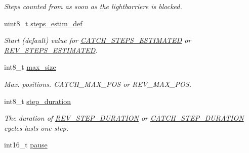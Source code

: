 \begin{CompactItemize}
\begin{CompactList}\small\item\em Steps counted from as soon as the lightbarriere is blocked. \item\end{CompactList}\item 
\hypertarget{structstepper__motor__t_3351f7a8001ddf9e7107778f92118717}{
uint8\_\-t \hyperlink{structstepper__motor__t_3351f7a8001ddf9e7107778f92118717}{steps\_\-estim\_\-def}}
\label{structstepper__motor__t_3351f7a8001ddf9e7107778f92118717}

\begin{CompactList}\small\item\em Start (default) value for \hyperlink{system_8h_ba0891209663ce63a925b18b553212c0}{CATCH\_\-STEPS\_\-ESTIMATED} or \hyperlink{system_8h_f0bdf5d3d7484b99405ef9f1373d8786}{REV\_\-STEPS\_\-ESTIMATED}. \item\end{CompactList}\item 
\hypertarget{structstepper__motor__t_9321372de70c6e871bcb0a9e14b28c87}{
int8\_\-t \hyperlink{structstepper__motor__t_9321372de70c6e871bcb0a9e14b28c87}{max\_\-size}}
\label{structstepper__motor__t_9321372de70c6e871bcb0a9e14b28c87}

\begin{CompactList}\small\item\em Max. positions. CATCH\_\-MAX\_\-POS or REV\_\-MAX\_\-POS. \item\end{CompactList}\item 
\hypertarget{structstepper__motor__t_c167ddba27c9544bb898f03c9b129ab9}{
int8\_\-t \hyperlink{structstepper__motor__t_c167ddba27c9544bb898f03c9b129ab9}{step\_\-duration}}
\label{structstepper__motor__t_c167ddba27c9544bb898f03c9b129ab9}

\begin{CompactList}\small\item\em The duration of \hyperlink{system_8h_a2e7a288930ea3e5c40dd46d9710c3c4}{REV\_\-STEP\_\-DURATION} or \hyperlink{system_8h_09bccded49054a78a07e0d63439e9963}{CATCH\_\-STEP\_\-DURATION} cycles lasts one step. \item\end{CompactList}\item 
\hypertarget{structstepper__motor__t_4335e6bd85d6eabe62ba1beeebc0cd5e}{
int16\_\-t \hyperlink{structstepper__motor__t_4335e6bd85d6eabe62ba1beeebc0cd5e}{pause}}
\label{structstepper__motor__t_4335e6bd85d6eabe62ba1beeebc0cd5e}


\end{CompactItemize}
